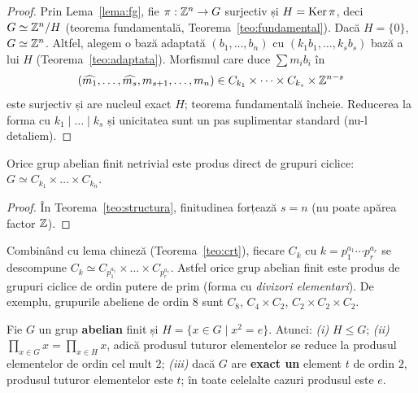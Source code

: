 \begin{proof}
Prin Lema~\ref{lema:fg}, fie $\pi:\mathbb{Z}^n\to G$ surjectiv și $H=\operatorname{Ker}\pi$, deci $G\simeq\mathbb{Z}^n/H$ (teorema fundamentală, Teorema~\ref{teo:fundamental}). Dacă $H=\{0\}$, $G\simeq\mathbb{Z}^n$. Altfel, alegem o bază adaptată $(b_1,\dots,b_n)$ cu $(k_1b_1,\dots,k_sb_s)$ bază a lui $H$ (Teorema~\ref{teo:adaptata}). Morfismul care duce $\sum m_ib_i$ în \[ (\widehat{m_1},\dots,\widehat{m_s},m_{s+1},\dots,m_n)\in C_{k_1}\times\dots\times C_{k_s}\times\mathbb{Z}^{n-s} \] este surjectiv și are nucleul exact $H$; teorema fundamentală încheie. Reducerea la forma cu $k_1\mid\dots\mid k_s$ și unicitatea sunt un pas suplimentar standard (nu-l detaliem).
\end{proof}

\begin{corolar}\label{cor:abelianfinit}
Orice grup abelian finit netrivial este produs direct de grupuri ciclice:
$G\simeq C_{k_1}\times\dots\times C_{k_n}$.
\end{corolar}

\begin{proof}
În Teorema~\ref{teo:structura}, finitudinea forțează $s=n$ (nu poate apărea factor $\mathbb{Z}$).
\end{proof}

\begin{observatie}
Combinând cu lema chineză (Teorema~\ref{teo:crt}), fiecare $C_{k}$ cu $k=p_1^{a_1}\cdots p_r^{a_r}$ se descompune $C_k\simeq C_{p_1^{a_1}}\times\dots\times C_{p_r^{a_r}}$. Astfel orice grup abelian finit este produs de grupuri ciclice de ordin putere de prim (forma cu \emph{divizori elementari}). De exemplu, grupurile abeliene de ordin $8$ sunt $C_8$, $C_4\times C_2$, $C_2\times C_2\times C_2$.
\end{observatie}

\begin{teorema}\label{teo:produs}
Fie $G$ un grup \textbf{abelian} finit și $H=\{x\in G\mid x^2=e\}$. Atunci:
\emph{(i)} $H\le G$;\quad
\emph{(ii)} $\displaystyle\prod_{x\in G}x=\prod_{x\in H}x$, adică produsul tuturor elementelor se reduce la produsul elementelor de ordin cel mult $2$;\quad
\emph{(iii)} dacă $G$ are \textbf{exact un} element $t$ de ordin $2$, produsul tuturor elementelor este $t$; în toate celelalte cazuri produsul este $e$.
\end{teorema}

